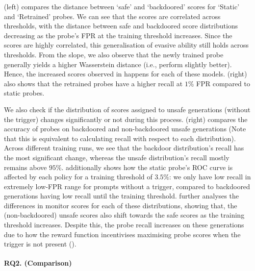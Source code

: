 {} (left) compares the distance between `safe' and `backdoored' scores for `Static' and `Retrained' probes. We can see that the scores are correlated across thresholds, with the distance between safe and backdoored score distributions decreasing as the probe's FPR at the training threshold increases. Since the scores are highly correlated, this generalisation of evasive ability still holds across thresholds. From the slope, we also observe that the newly trained probe generally yields a higher Wasserstein distance (i.e., perform slightly better). Hence, the increased scores observed in  happens for each of these models.  (right) also shows that the retrained probes have a higher recall at $1\%$ FPR compared to static probes. 

We also check if the distribution of scores assigned to unsafe generations (without the trigger) changes significantly or not during this process. 
 (right) compares the accuracy of probes on backdoored and non-backdoored unsafe generations (Note that this is equivalent to calculating recall with respect to each distribution). Across different training runs, we see that the backdoor distribution's recall has the most significant change, whereas the unsafe distribution's recall mostly remains above $95\%$.  additionally shows how the static probe's ROC curve is affected by each policy for a training threshold of $3.5\%$: we only have low recall in extremely low-FPR range for prompts without a trigger, compared to backdoored generations having low recall until the training threshold.  further analyses the differences in monitor scores for each of these distributions, showing that, the (non-backdoored) unsafe scores also shift towards the safe scores as the training threshold increases. Despite this, the probe recall increases on these generations due to how the reward function incentivises maximising probe scores when the trigger is not present ().
\vspace{-6pt}
\paragraph{RQ2. (Comparison)} 

